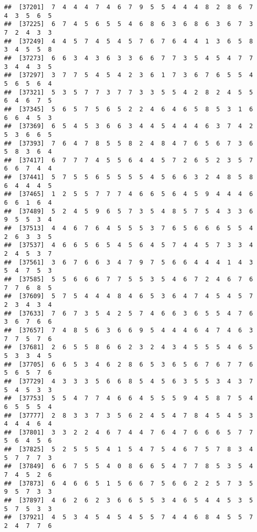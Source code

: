 \documentclass[
]{book}
\begin{document}
\begin{verbatim}
##  [37201]  7  4  4  4  7  4  6  7  9  5  5  4  4  4  8  2  8  6  7  4  3  5  6  5
##  [37225]  6  7  4  5  6  5  5  4  6  8  6  3  6  8  6  3  6  7  3  7  2  4  3  3
##  [37249]  4  4  5  7  4  5  4  5  7  6  7  6  4  4  1  3  6  5  8  3  4  5  5  8
##  [37273]  6  6  3  4  3  6  3  3  6  6  7  7  3  5  4  5  4  7  7  3  4  4  3  5
##  [37297]  3  7  7  5  4  5  4  2  3  6  1  7  3  6  7  6  5  5  4  5  6  5  6  4
##  [37321]  5  3  5  7  7  3  7  7  3  3  5  5  4  2  8  2  4  5  5  6  4  6  7  5
##  [37345]  5  6  5  7  5  6  5  2  2  4  6  4  6  5  8  5  3  1  6  6  6  4  5  3
##  [37369]  6  5  4  5  3  6  6  3  4  4  5  4  4  4  6  3  7  4  2  5  3  6  6  5
##  [37393]  7  6  4  7  8  5  5  8  2  4  8  4  7  6  5  6  7  3  6  5  8  3  6  4
##  [37417]  6  7  7  7  4  5  5  6  4  4  5  7  2  6  5  2  3  5  7  6  6  7  4  4
##  [37441]  5  7  5  5  6  5  5  5  5  4  5  6  6  3  2  4  8  5  8  6  4  4  4  5
##  [37465]  1  2  5  5  7  7  7  4  6  6  5  6  4  5  9  4  4  4  6  6  6  1  6  4
##  [37489]  5  2  4  5  9  6  5  7  3  5  4  8  5  7  5  4  3  3  6  9  5  5  3  4
##  [37513]  4  4  6  7  6  4  5  5  5  3  7  6  5  6  6  6  5  5  4  2  6  3  3  5
##  [37537]  4  6  6  5  6  5  4  5  6  4  5  7  4  4  5  7  3  3  4  2  4  5  3  7
##  [37561]  3  6  7  6  6  3  4  7  9  7  5  6  6  4  4  4  1  4  3  5  4  7  5  3
##  [37585]  5  5  6  6  6  7  7  5  5  3  5  4  6  7  2  4  6  7  6  7  7  6  8  5
##  [37609]  5  7  5  4  4  4  8  4  6  5  3  6  4  7  4  5  4  5  7  2  3  4  3  4
##  [37633]  7  6  7  3  5  4  2  5  7  4  6  6  3  6  5  5  4  7  6  3  6  7  6  6
##  [37657]  7  4  8  5  6  3  6  6  9  5  4  4  4  6  4  7  4  6  3  7  7  5  7  6
##  [37681]  2  6  5  5  8  6  6  2  3  2  4  3  4  5  5  5  4  6  5  5  3  3  4  5
##  [37705]  6  6  5  3  4  6  2  8  6  5  3  6  5  6  7  6  7  7  6  5  6  5  7  6
##  [37729]  4  3  3  3  5  6  6  8  5  4  5  6  3  5  5  3  4  3  7  5  4  5  3  3
##  [37753]  5  5  4  7  7  4  6  6  4  5  5  5  9  4  5  8  7  5  4  6  5  5  5  4
##  [37777]  2  8  3  3  7  3  5  6  2  4  5  4  7  8  4  5  4  5  3  4  4  4  6  4
##  [37801]  3  3  2  2  4  6  7  4  4  7  6  4  7  6  6  6  5  7  7  5  6  4  5  6
##  [37825]  5  2  5  5  5  4  1  5  4  7  5  4  6  7  5  7  8  3  4  5  7  7  7  3
##  [37849]  6  6  7  5  5  4  0  8  6  6  5  4  7  7  8  5  3  5  4  7  4  5  2  6
##  [37873]  6  4  6  6  5  1  5  6  6  7  5  6  6  2  2  5  7  3  5  9  5  7  3  3
##  [37897]  4  6  2  6  2  3  6  6  5  5  3  4  6  5  4  4  5  3  5  5  7  5  3  3
##  [37921]  4  5  3  4  5  4  5  4  5  5  7  4  4  6  8  4  5  5  7  2  4  7  7  6

\end{verbatim}
\end{document}
